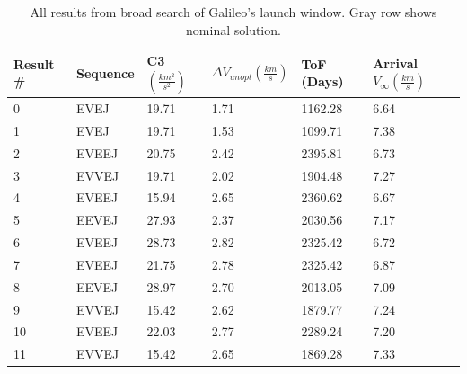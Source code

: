 \documentclass[letterpaper, preprint, paper,11pt]{AAS}	%
\begin{document}
\begin{table}[h!]
    \centering
    \caption{All results from broad search of Galileo's launch window. Gray row shows nominal solution.}
    \begin{tabular}{l|lllll}
    Result \# & Sequence   & C3 $(\frac{km^2}{s^2})$    & $\Delta V_{unopt} (\frac{km}{s})$   & ToF (Days)            & Arrival $V_\infty (\frac{km}{s})$            \\
    \hline
    0         & EVEJ  & 19.71 & 1.71 & 1162.28        & 6.64 \\
    1         & EVEJ  & 19.71 & 1.53 & 1099.71        & 7.38 \\
    2         & EVEEJ & 20.75 & 2.42 & 2395.81        & 6.73 \\
    3         & EVVEJ & 19.71 & 2.02 & 1904.48        & 7.27 \\
    4         & EVEEJ & 15.94 & 2.65 & 2360.62        & 6.67 \\
    5         & EEVEJ & 27.93 & 2.37 & 2030.56        & 7.17 \\
    6         & EVEEJ & 28.73 & 2.82 & 2325.42        & 6.72 \\
    \rowcolor{lightgray}7         & EVEEJ & 21.75 & 2.78 & 2325.42        & 6.87 \\
    8         & EEVEJ & 28.97 & 2.70 & 2013.05        & 7.09 \\
    9         & EVVEJ & 15.42 & 2.62 & 1879.77        & 7.24 \\
    10        & EVEEJ & 22.03 & 2.77 & 2289.24        & 7.20 \\
    11        & EVVEJ & 15.42 & 2.65 & 1869.28        & 7.33
    \end{tabular}
\end{table}
\end{document}
